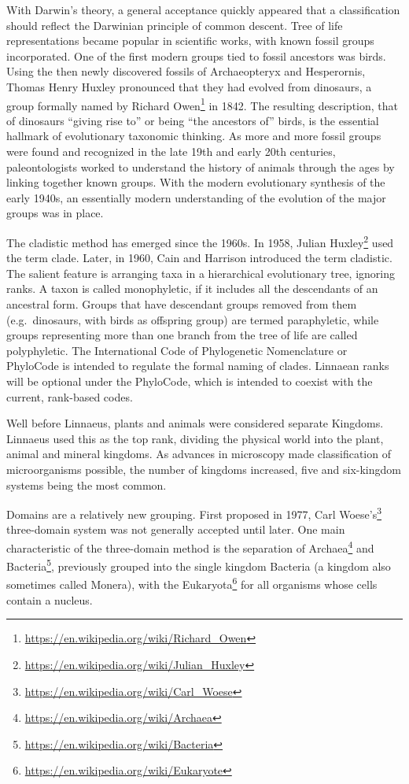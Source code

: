 \documentclass[]{book}
\let\rmarkdownfootnote\footnote%
\def\footnote{\protect\rmarkdownfootnote}
\renewcommand{\href}[2]{#2\footnote{\url{#1}}}
\theoremstyle{definition}
\theoremstyle{definition}
\theoremstyle{definition}
\theoremstyle{remark}
\begin{document}
With Darwin's theory, a general acceptance quickly appeared that a
classification should reflect the Darwinian principle of common descent.
Tree of life representations became popular in scientific works, with
known fossil groups incorporated. One of the first modern groups tied to
fossil ancestors was birds. Using the then newly discovered fossils of
Archaeopteryx and Hesperornis, Thomas Henry Huxley pronounced that they
had evolved from dinosaurs, a group formally named by Richard \href{https://en.wikipedia.org/wiki/Richard_Owen}{Owen} in
1842. The resulting description, that of dinosaurs ``giving rise to'' or
being ``the ancestors of'' birds, is the essential hallmark of
evolutionary taxonomic thinking. As more and more fossil groups were
found and recognized in the late 19th and early 20th centuries,
paleontologists worked to understand the history of animals through the
ages by linking together known groups. With the modern evolutionary
synthesis of the early 1940s, an essentially modern understanding of the
evolution of the major groups was in place.

The cladistic method has emerged since the 1960s. In 1958, \href{https://en.wikipedia.org/wiki/Julian_Huxley}{Julian Huxley}
used the term clade. Later, in 1960, Cain and Harrison introduced the
term cladistic. The salient feature is arranging taxa in a hierarchical
evolutionary tree, ignoring ranks. A taxon is called monophyletic, if it
includes all the descendants of an ancestral form. Groups that have
descendant groups removed from them (e.g.~dinosaurs, with birds as
offspring group) are termed paraphyletic, while groups representing more
than one branch from the tree of life are called polyphyletic. The
International Code of Phylogenetic Nomenclature or PhyloCode is intended
to regulate the formal naming of clades. Linnaean ranks will be optional
under the PhyloCode, which is intended to coexist with the current,
rank-based codes.

Well before Linnaeus, plants and animals were considered separate
Kingdoms. Linnaeus used this as the top rank, dividing the physical
world into the plant, animal and mineral kingdoms. As advances in
microscopy made classification of microorganisms possible, the number of
kingdoms increased, five and six-kingdom systems being the most common.

Domains are a relatively new grouping. First proposed in 1977,
\href{https://en.wikipedia.org/wiki/Carl_Woese}{Carl Woese's}
three-domain system was not generally accepted until later. One main
characteristic of the three-domain method is the separation of \href{https://en.wikipedia.org/wiki/Archaea}{Archaea}
and \href{https://en.wikipedia.org/wiki/Bacteria}{Bacteria}, previously grouped into the single kingdom Bacteria (a
kingdom also sometimes called Monera), with the \href{https://en.wikipedia.org/wiki/Eukaryote}{Eukaryota} for all
organisms whose cells contain a nucleus.
\end{document}
